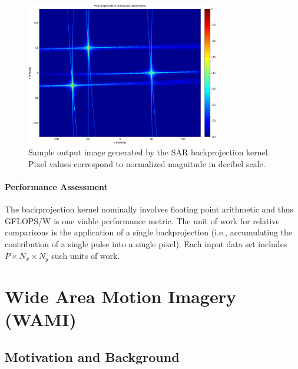\documentclass{report}
\begin{document}
\begin{figure}
    \centering
    \includegraphics[width=0.75\textwidth]{figs/sample_bp_output}
    \caption{Sample output image generated by the SAR backprojection kernel.  %
Pixel values correspond to normalized magnitude in decibel scale.}
    \label{fig:bp_output}
\end{figure}

\subsubsection{Performance Assessment}

The backprojection kernel nominally involves floating point arithmetic
and thus GFLOPS/W is one viable performance metric.
The unit of work for relative comparisons is the application of a single
backprojection (i.e., accumulating the contribution of a single pulse into
a single pixel).
Each input data set includes $P \times N_x \times N_y$ such units of work.


\chapter{Wide Area Motion Imagery (WAMI)}


\section{Motivation and Background}
\end{document}
